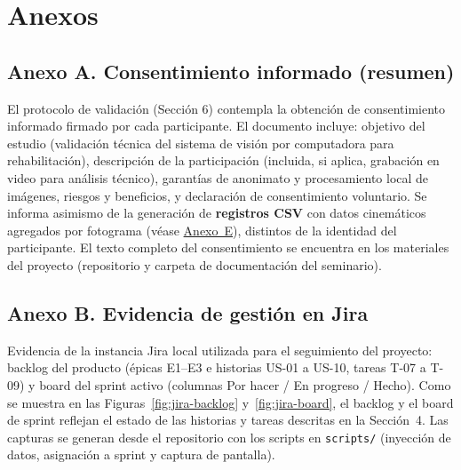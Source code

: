 \documentclass[11pt,a4paper]{article}
\begin{document}
\clearpage
\section*{Anexos}
\label{sec:anexos}

\subsection*{Anexo A. Consentimiento informado (resumen)}
El protocolo de validación (Sección 6) contempla la obtención de consentimiento informado firmado por cada participante. El documento incluye: objetivo del estudio (validación técnica del sistema de visión por computadora para rehabilitación), descripción de la participación (incluida, si aplica, grabación en video para análisis técnico), garantías de anonimato y procesamiento local de imágenes, riesgos y beneficios, y declaración de consentimiento voluntario. Se informa asimismo de la generación de \textbf{registros CSV} con datos cinemáticos agregados por fotograma (véase \hyperref[anexo:csv-sesion]{Anexo~E}), distintos de la identidad del participante. El texto completo del consentimiento se encuentra en los materiales del proyecto (repositorio y carpeta de documentación del seminario).

\subsection*{Anexo B. Evidencia de gestión en Jira}
\label{anexo:jira}
Evidencia de la instancia Jira local utilizada para el seguimiento del proyecto: backlog del producto (épicas E1--E3 e historias US-01 a US-10, tareas T-07 a T-09) y board del sprint activo (columnas Por hacer / En progreso / Hecho). Como se muestra en las Figuras~\ref{fig:jira-backlog} y~\ref{fig:jira-board}, el backlog y el board de sprint reflejan el estado de las historias y tareas descritas en la Sección~4. Las capturas se generan desde el repositorio con los scripts en \texttt{scripts/} (inyección de datos, asignación a sprint y captura de pantalla).
\end{document}
